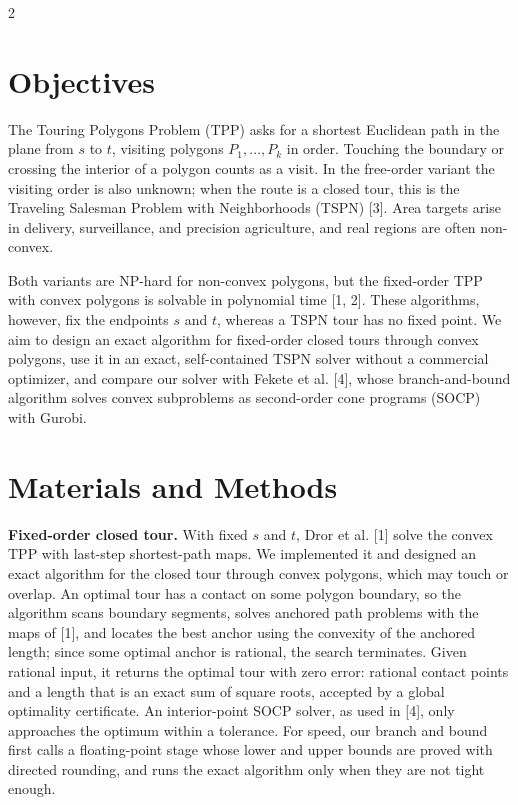 \documentclass[10pt,a4paper]{article}
\begin{document}
\begin{multicols}{2}

\section{Objectives}

The Touring Polygons Problem (TPP) asks for a shortest Euclidean path in the plane from \(s\) to \(t\), visiting polygons \(P_1,\ldots,P_k\) in order. Touching the boundary or crossing the interior of a polygon counts as a visit. In the free-order variant the visiting order is also unknown; when the route is a closed tour, this is the Traveling Salesman Problem with Neighborhoods (TSPN) [3]. Area targets arise in delivery, surveillance, and precision agriculture, and real regions are often non-convex.

Both variants are NP-hard for non-convex polygons, but the fixed-order TPP with convex polygons is solvable in polynomial time [1, 2]. These algorithms, however, fix the endpoints \(s\) and \(t\), whereas a TSPN tour has no fixed point. We aim to design an exact algorithm for fixed-order closed tours through convex polygons, use it in an exact, self-contained TSPN solver without a commercial optimizer, and compare our solver with Fekete et al. [4], whose branch-and-bound algorithm solves convex subproblems as second-order cone programs (SOCP) with Gurobi.

\section{Materials and Methods}

\textbf{Fixed-order closed tour.} With fixed \(s\) and \(t\), Dror et al. [1] solve the convex TPP with last-step shortest-path maps. We implemented it and designed an exact algorithm for the closed tour through convex polygons, which may touch or overlap. An optimal tour has a contact on some polygon boundary, so the algorithm scans boundary segments, solves anchored path problems with the maps of [1], and locates the best anchor using the convexity of the anchored length; since some optimal anchor is rational, the search terminates. Given rational input, it returns the optimal tour with zero error: rational contact points and a length that is an exact sum of square roots, accepted by a global optimality certificate. An interior-point SOCP solver, as used in [4], only approaches the optimum within a tolerance. For speed, our branch and bound first calls a floating-point stage whose lower and upper bounds are proved with directed rounding, and runs the exact algorithm only when they are not tight enough.


\end{multicols}
\end{document}
